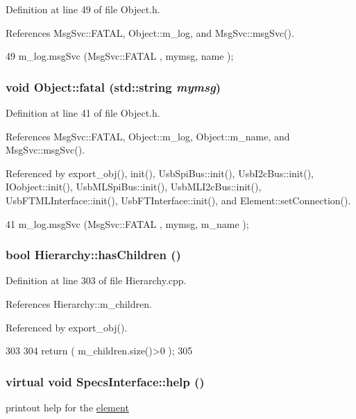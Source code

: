 Definition at line 49 of file Object.h.

References MsgSvc::FATAL, Object::m\_\-log, and MsgSvc::msgSvc().


\begin{DoxyCode}
49 { m_log.msgSvc (MsgSvc::FATAL   , mymsg, name ); }
\end{DoxyCode}
\hypertarget{classObject_aad5a16aac7516ce65bd5ec02ab07fc80}{
\subsubsection[{fatal}]{\setlength{\rightskip}{0pt plus 5cm}void Object::fatal (std::string {\em mymsg})}}
\label{classObject_aad5a16aac7516ce65bd5ec02ab07fc80}


Definition at line 41 of file Object.h.

References MsgSvc::FATAL, Object::m\_\-log, Object::m\_\-name, and MsgSvc::msgSvc().

Referenced by export\_\-obj(), init(), UsbSpiBus::init(), UsbI2cBus::init(), IOobject::init(), UsbMLSpiBus::init(), UsbMLI2cBus::init(), UsbFTMLInterface::init(), UsbFTInterface::init(), and Element::setConnection().


\begin{DoxyCode}
41 { m_log.msgSvc (MsgSvc::FATAL   , mymsg, m_name ); }
\end{DoxyCode}
\hypertarget{classHierarchy_a255174fe4d316d2a3f430dcb9dab29f1}{
\subsubsection[{hasChildren}]{\setlength{\rightskip}{0pt plus 5cm}bool Hierarchy::hasChildren ()}}
\label{classHierarchy_a255174fe4d316d2a3f430dcb9dab29f1}


Definition at line 303 of file Hierarchy.cpp.

References Hierarchy::m\_\-children.

Referenced by export\_\-obj().


\begin{DoxyCode}
303                               {
304   return ( m_children.size()>0 );
305 }
\end{DoxyCode}
\hypertarget{classSpecsInterface_a24bf2b5e2da6c675ba5de3b226481a73}{
\subsubsection[{help}]{\setlength{\rightskip}{0pt plus 5cm}virtual void SpecsInterface::help ()}}
\label{classSpecsInterface_a24bf2b5e2da6c675ba5de3b226481a73}
printout help for the \hyperlink{namespaceelement}{element} 

